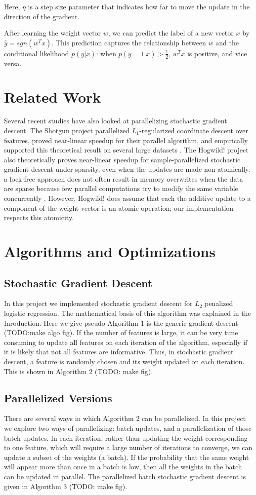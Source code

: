 \documentclass{article}
\begin{document}
Here, $\eta$ is a step size parameter that indicates how far to move the update in the direction of the gradient.

After learning the weight vector $w$, we can predict the label of a new vector $x$ by $\hat{y} = sgn(w^Tx)$. This prediction captures the relationship between $w$ and the conditional likelihood $p(y|x)$: when $p(y = 1|x) > \frac{1}{2}$, $w^Tx$ is positive, and vice versa.

\section{Related Work}
Several recent studies have also looked at parallelizing stochastic gradient descent. The Shotgun project parallelized $L_1$-regularized coordinate descent over features, proved near-linear speedup for their parallel algorithm, and empirically supported this theoretical result on several large datasets \cite{shotgun2011}. The Hogwild! project also theoretically proves near-linear speedup for sample-parallelized stochastic gradient descent under sparsity, even when the updates are made non-atomically: a lock-free approach does not often result in memory overwrites when the data are sparse because few parallel computations try to modify the same variable concurrently \cite{hogwild2011}. However, Hogwild! does assume that each the additive update to a component of the weight vector is an atomic operation; our implementation respects this atomicity.

\section{Algorithms and Optimizations}
\subsection{Stochastic Gradient Descent}
In this project we implemented stochastic gradient descent for $L_2$ penalized logistic regression. The mathematical basis of this algorithm was explained in the Inroduction. Here we give pseudo
Algorithm 1 is the generic gradient descent (TODO:make algo fig). If the number of features is large, it can be very time consuming to update all features on each iteration of the algorithm, especially if it is likely that not all features are informative.  Thus, in stochastic gradient descent, a feature is randomly chosen and its weight updated on each iteration. This is shown in Algorithm 2 (TODO: make fig).
\subsection{Parallelized Versions}
There are several ways in which Algorithm 2 can be parallelized. In this project we explore two ways of parallelizing: batch updates, and a parallelization of those batch updates.  In each iteration, rather than updating the weight corresponding to one feature, which will require a large number of iterations to converge, we can update a subset of the weights (a batch).  If the probability that the same weight will appear more than once in a batch is low, then all the weights in the batch can be updated in parallel. The parallelized batch stochastic gradient descent is given in Algorithm 3 (TODO: make fig).
\end{document}
